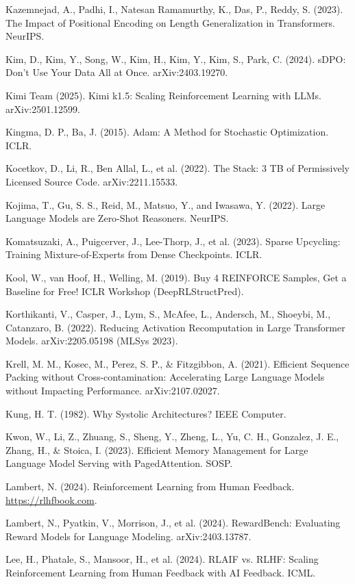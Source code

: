 {\begin{enumerate}[leftmargin=*,itemsep=1pt,label={[\arabic*]}]
\item Kazemnejad, A., Padhi, I., Natesan Ramamurthy, K., Das, P., Reddy, S. (2023). The Impact of Positional Encoding on Length Generalization in Transformers. NeurIPS.
\item Kim, D., Kim, Y., Song, W., Kim, H., Kim, Y., Kim, S., Park, C. (2024). sDPO: Don't Use Your Data All at Once. arXiv:2403.19270.
\item Kimi Team (2025). Kimi k1.5: Scaling Reinforcement Learning with LLMs. arXiv:2501.12599.
\item Kingma, D. P., Ba, J. (2015). Adam: A Method for Stochastic Optimization. ICLR.
\item Kocetkov, D., Li, R., Ben Allal, L., et al. (2022). The Stack: 3 TB of Permissively Licensed Source Code. arXiv:2211.15533.
\item Kojima, T., Gu, S. S., Reid, M., Matsuo, Y., and Iwasawa, Y. (2022). Large Language Models are Zero-Shot Reasoners. NeurIPS.
\item Komatsuzaki, A., Puigcerver, J., Lee-Thorp, J., et al. (2023). Sparse Upcycling: Training Mixture-of-Experts from Dense Checkpoints. ICLR.
\item Kool, W., van Hoof, H., Welling, M. (2019). Buy 4 REINFORCE Samples, Get a Baseline for Free! ICLR Workshop (DeepRLStructPred).
\item Korthikanti, V., Casper, J., Lym, S., McAfee, L., Andersch, M., Shoeybi, M., Catanzaro, B. (2022). Reducing Activation Recomputation in Large Transformer Models. arXiv:2205.05198 (MLSys 2023).
\item Krell, M. M., Kosec, M., Perez, S. P., \& Fitzgibbon, A. (2021). Efficient Sequence Packing without Cross-contamination: Accelerating Large Language Models without Impacting Performance. arXiv:2107.02027.
\item Kung, H. T. (1982). Why Systolic Architectures? IEEE Computer.
\item Kwon, W., Li, Z., Zhuang, S., Sheng, Y., Zheng, L., Yu, C. H., Gonzalez, J. E., Zhang, H., \& Stoica, I. (2023). Efficient Memory Management for Large Language Model Serving with PagedAttention. SOSP.
\item Lambert, N. (2024). Reinforcement Learning from Human Feedback. \url{https://rlhfbook.com}.
\item Lambert, N., Pyatkin, V., Morrison, J., et al. (2024). RewardBench: Evaluating Reward Models for Language Modeling. arXiv:2403.13787.
\item Lee, H., Phatale, S., Mansoor, H., et al. (2024). RLAIF vs. RLHF: Scaling Reinforcement Learning from Human Feedback with AI Feedback. ICML.

\end{enumerate}}
